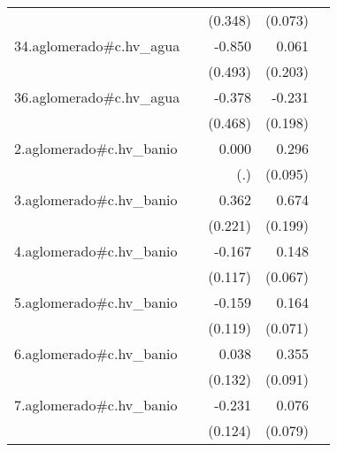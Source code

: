 {\begin{longtable}{l*{4}{D{.}{.}{-1}}}
            &                     &     (0.348)         &     (0.073)         &                     \\
\addlinespace
34.aglomerado#c.hv\_agua&                     &      -0.850         &       0.061         &                     \\
            &                     &     (0.493)         &     (0.203)         &                     \\
\addlinespace
36.aglomerado#c.hv\_agua&                     &      -0.378         &      -0.231         &                     \\
            &                     &     (0.468)         &     (0.198)         &                     \\
\addlinespace
2.aglomerado#c.hv\_banio&                     &       0.000         &       0.296\sym{**} &                     \\
            &                     &         (.)         &     (0.095)         &                     \\
\addlinespace
3.aglomerado#c.hv\_banio&                     &       0.362         &       0.674\sym{***}&                     \\
            &                     &     (0.221)         &     (0.199)         &                     \\
\addlinespace
4.aglomerado#c.hv\_banio&                     &      -0.167         &       0.148\sym{*}  &                     \\
            &                     &     (0.117)         &     (0.067)         &                     \\
\addlinespace
5.aglomerado#c.hv\_banio&                     &      -0.159         &       0.164\sym{*}  &                     \\
            &                     &     (0.119)         &     (0.071)         &                     \\
\addlinespace
6.aglomerado#c.hv\_banio&                     &       0.038         &       0.355\sym{***}&                     \\
            &                     &     (0.132)         &     (0.091)         &                     \\
\addlinespace
7.aglomerado#c.hv\_banio&                     &      -0.231         &       0.076         &                     \\
            &                     &     (0.124)         &     (0.079)         &                     \\

\end{longtable}}
